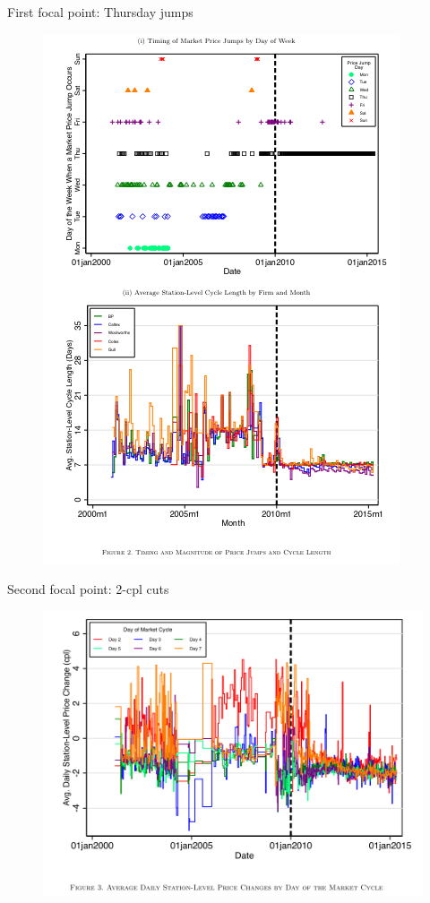 \documentclass[dvipsnames]{beamer}
\begin{document}
  \begin{frame}{First focal point: Thursday jumps}
    \begin{figure}[htp]
      \centering
      \includegraphics[height=.9\textheight, keepaspectratio=true]{fig2.png}
    \end{figure}
  \end{frame}
  \begin{frame}{Second focal point: 2-cpl cuts}
    \begin{figure}[htp]
      \centering
    \includegraphics[width=\textwidth, keepaspectratio=true]{fig3.png}  
    \end{figure}
  \end{frame}
\end{document}
